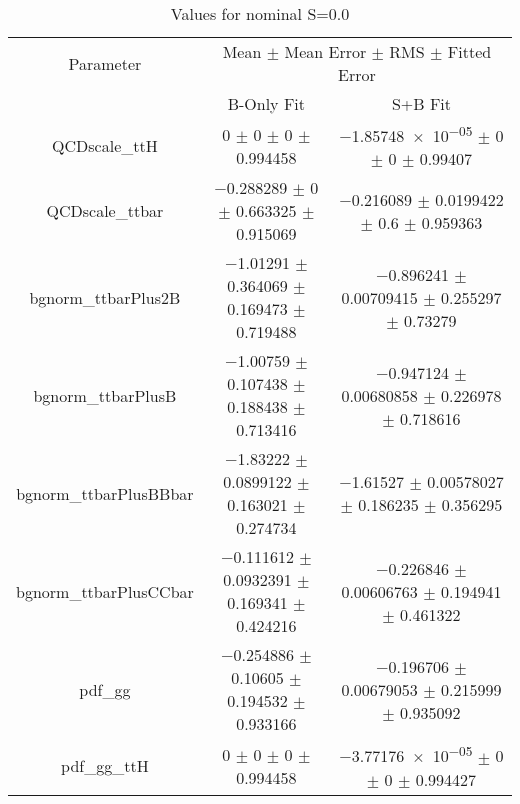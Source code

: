 \begin{table}
\centering
\caption{Values for nominal S=0.0}
\begin{tabular}{ccc}
\toprule
Parameter & \multicolumn{2}{c}{Mean $\pm$ Mean Error $\pm$ RMS $\pm$ Fitted Error}\\
 & B-Only Fit & S+B Fit\\
\midrule
QCDscale\_ttH & \num{0} $\pm$ \num{0} $\pm$ \num{0} $\pm$ \num{0.994458} & \num{-1.85748e-05} $\pm$ \num{0} $\pm$ \num{0} $\pm$ \num{0.99407}\\
QCDscale\_ttbar & \num{-0.288289} $\pm$ \num{0} $\pm$ \num{0.663325} $\pm$ \num{0.915069} & \num{-0.216089} $\pm$ \num{0.0199422} $\pm$ \num{0.6} $\pm$ \num{0.959363}\\
bgnorm\_ttbarPlus2B & \num{-1.01291} $\pm$ \num{0.364069} $\pm$ \num{0.169473} $\pm$ \num{0.719488} & \num{-0.896241} $\pm$ \num{0.00709415} $\pm$ \num{0.255297} $\pm$ \num{0.73279}\\
bgnorm\_ttbarPlusB & \num{-1.00759} $\pm$ \num{0.107438} $\pm$ \num{0.188438} $\pm$ \num{0.713416} & \num{-0.947124} $\pm$ \num{0.00680858} $\pm$ \num{0.226978} $\pm$ \num{0.718616}\\
bgnorm\_ttbarPlusBBbar & \num{-1.83222} $\pm$ \num{0.0899122} $\pm$ \num{0.163021} $\pm$ \num{0.274734} & \num{-1.61527} $\pm$ \num{0.00578027} $\pm$ \num{0.186235} $\pm$ \num{0.356295}\\
bgnorm\_ttbarPlusCCbar & \num{-0.111612} $\pm$ \num{0.0932391} $\pm$ \num{0.169341} $\pm$ \num{0.424216} & \num{-0.226846} $\pm$ \num{0.00606763} $\pm$ \num{0.194941} $\pm$ \num{0.461322}\\
pdf\_gg & \num{-0.254886} $\pm$ \num{0.10605} $\pm$ \num{0.194532} $\pm$ \num{0.933166} & \num{-0.196706} $\pm$ \num{0.00679053} $\pm$ \num{0.215999} $\pm$ \num{0.935092}\\
pdf\_gg\_ttH & \num{0} $\pm$ \num{0} $\pm$ \num{0} $\pm$ \num{0.994458} & \num{-3.77176e-05} $\pm$ \num{0} $\pm$ \num{0} $\pm$ \num{0.994427}\\
\bottomrule
\end{tabular}
\end{table}